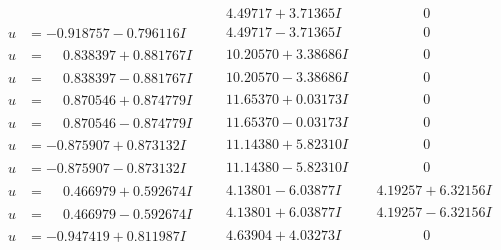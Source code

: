 \documentclass[1p]{elsarticle_modified}
\theoremstyle{definition}
\begin{document}
$$\begin{array}{c|c|c}
 & \phantom{-}4.49717 + 3.71365 I & \phantom{-0.000000 } 0 \\ \hline\begin{aligned}
u &= -0.918757 - 0.796116 I\end{aligned}
 & \phantom{-}4.49717 - 3.71365 I & \phantom{-0.000000 } 0 \\ \hline\begin{aligned}
u &= \phantom{-}0.838397 + 0.881767 I\end{aligned}
 & \phantom{-}10.20570 + 3.38686 I & \phantom{-0.000000 } 0 \\ \hline\begin{aligned}
u &= \phantom{-}0.838397 - 0.881767 I\end{aligned}
 & \phantom{-}10.20570 - 3.38686 I & \phantom{-0.000000 } 0 \\ \hline\begin{aligned}
u &= \phantom{-}0.870546 + 0.874779 I\end{aligned}
 & \phantom{-}11.65370 + 0.03173 I & \phantom{-0.000000 } 0 \\ \hline\begin{aligned}
u &= \phantom{-}0.870546 - 0.874779 I\end{aligned}
 & \phantom{-}11.65370 - 0.03173 I & \phantom{-0.000000 } 0 \\ \hline\begin{aligned}
u &= -0.875907 + 0.873132 I\end{aligned}
 & \phantom{-}11.14380 + 5.82310 I & \phantom{-0.000000 } 0 \\ \hline\begin{aligned}
u &= -0.875907 - 0.873132 I\end{aligned}
 & \phantom{-}11.14380 - 5.82310 I & \phantom{-0.000000 } 0 \\ \hline\begin{aligned}
u &= \phantom{-}0.466979 + 0.592674 I\end{aligned}
 & \phantom{-}4.13801 - 6.03877 I & \phantom{-}4.19257 + 6.32156 I \\ \hline\begin{aligned}
u &= \phantom{-}0.466979 - 0.592674 I\end{aligned}
 & \phantom{-}4.13801 + 6.03877 I & \phantom{-}4.19257 - 6.32156 I \\ \hline\begin{aligned}
u &= -0.947419 + 0.811987 I\end{aligned}
 & \phantom{-}4.63904 + 4.03273 I & \phantom{-0.000000 } 0 \\ \hline\begin{aligned}

\end{aligned}
\end{array}$$
\end{document}
